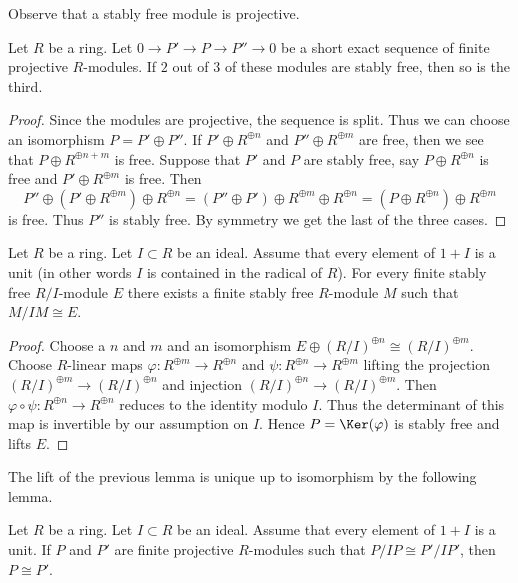 \noindent
Observe that a stably free module is projective.

\begin{lemma}
\label{lemma-exact-category-stably-free}
Let $R$ be a ring. Let $0 \to P' \to P \to P'' \to 0$ be a short
exact sequence of finite projective $R$-modules. If $2$ out of $3$
of these modules are stably free, then so is the third.
\end{lemma}

\begin{proof}
Since the modules are projective, the sequence is split. Thus we can
choose an isomorphism $P = P' \oplus P''$. If $P' \oplus R^{\oplus n}$
and $P'' \oplus R^{\oplus m}$ are free, then we see that
$P \oplus R^{\oplus n + m}$ is free. Suppose that $P'$ and $P$ are
stably free, say $P \oplus R^{\oplus n}$ is free and $P' \oplus R^{\oplus m}$
is free. Then
$$
P'' \oplus (P' \oplus R^{\oplus m}) \oplus R^{\oplus n} =
(P'' \oplus P') \oplus R^{\oplus m} \oplus R^{\oplus n} =
(P \oplus R^{\oplus n}) \oplus R^{\oplus m}
$$
is free. Thus $P''$ is stably free. By symmetry we get the last of the
three cases.
\end{proof}

\begin{lemma}
\label{lemma-lift-stably-free}
Let $R$ be a ring. Let $I \subset R$ be an ideal. Assume that
every element of $1 + I$ is a unit (in other words $I$ is contained
in the radical of $R$). For every finite stably free $R/I$-module $E$
there exists a finite stably free $R$-module $M$ such that $M/IM \cong E$.
\end{lemma}

\begin{proof}
Choose a $n$ and $m$ and an isomorphism
$E \oplus (R/I)^{\oplus n} \cong (R/I)^{\oplus m}$.
Choose $R$-linear maps $\varphi : R^{\oplus m} \to R^{\oplus n}$
and $\psi : R^{\oplus n} \to R^{\oplus m}$ lifting the
projection $(R/I)^{\oplus m} \to (R/I)^{\oplus n}$
and injection $(R/I)^{\oplus n} \to (R/I)^{\oplus m}$.
Then $\varphi \circ \psi : R^{\oplus n} \to R^{\oplus n}$
reduces to the identity modulo $I$. Thus the determinant of
this map is invertible by our assumption on $I$. Hence
$P = \Ker(\varphi)$ is stably free and lifts $E$.
\end{proof}

\noindent
The lift of the previous lemma is unique up to isomorphism by the
following lemma.

\begin{lemma}
\label{lemma-isomorphic-finite-projective-lifts}
Let $R$ be a ring. Let $I \subset R$ be an ideal. Assume that
every element of $1 + I$ is a unit. If $P$ and $P'$ are finite
projective $R$-modules such that $P/IP \cong P'/IP'$, then $P \cong P'$.
\end{lemma}

